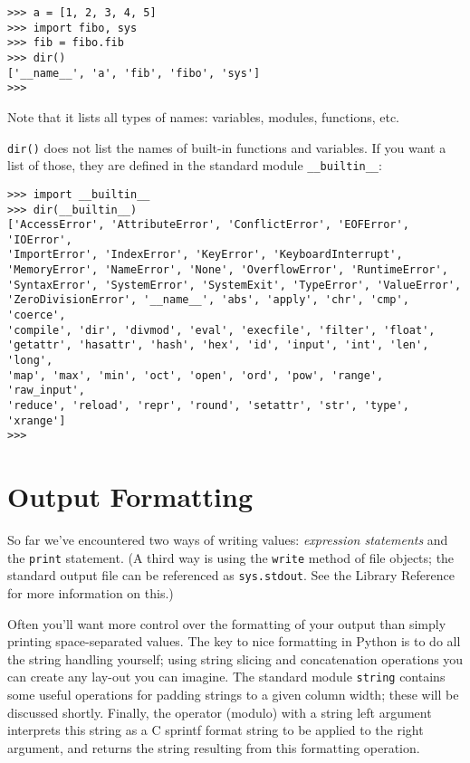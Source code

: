 \bcode\begin{verbatim}
>>> a = [1, 2, 3, 4, 5]
>>> import fibo, sys
>>> fib = fibo.fib
>>> dir()
['__name__', 'a', 'fib', 'fibo', 'sys']
>>>
\end{verbatim}\ecode
%
Note that it lists all types of names: variables, modules, functions, etc.

{\tt dir()} does not list the names of built-in functions and variables.
If you want a list of those, they are defined in the standard module
{\tt __builtin__}:

\bcode\begin{verbatim}
>>> import __builtin__
>>> dir(__builtin__)
['AccessError', 'AttributeError', 'ConflictError', 'EOFError', 'IOError',
'ImportError', 'IndexError', 'KeyError', 'KeyboardInterrupt',
'MemoryError', 'NameError', 'None', 'OverflowError', 'RuntimeError',
'SyntaxError', 'SystemError', 'SystemExit', 'TypeError', 'ValueError',
'ZeroDivisionError', '__name__', 'abs', 'apply', 'chr', 'cmp', 'coerce',
'compile', 'dir', 'divmod', 'eval', 'execfile', 'filter', 'float',
'getattr', 'hasattr', 'hash', 'hex', 'id', 'input', 'int', 'len', 'long',
'map', 'max', 'min', 'oct', 'open', 'ord', 'pow', 'range', 'raw_input',
'reduce', 'reload', 'repr', 'round', 'setattr', 'str', 'type', 'xrange']
>>>
\end{verbatim}\ecode


\chapter{Output Formatting}

So far we've encountered two ways of writing values: {\em expression
statements} and the {\tt print} statement.  (A third way is using the
{\tt write} method of file objects; the standard output file can be
referenced as {\tt sys.stdout}.  See the Library Reference for more
information on this.)

Often you'll want more control over the formatting of your output than
simply printing space-separated values.  The key to nice formatting in
Python is to do all the string handling yourself; using string slicing
and concatenation operations you can create any lay-out you can imagine.
The standard module {\tt string} contains some useful operations for
padding strings to a given column width; these will be discussed shortly.
Finally, the \code{\%} operator (modulo) with a string left argument
interprets this string as a C sprintf format string to be applied to the
right argument, and returns the string resulting from this formatting
operation.


